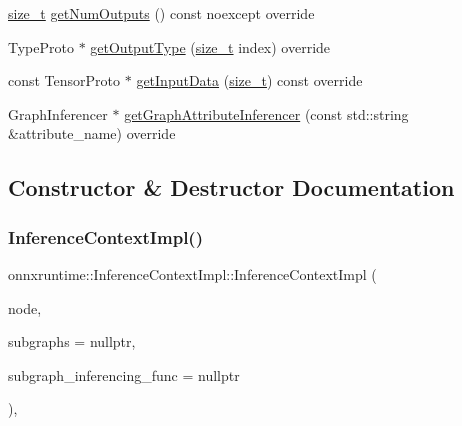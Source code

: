 \begin{DoxyCompactItemize}
\mbox{\hyperlink{mlasi_8h_a503efbc1c6e50825320ad909366b78ab}{size\+\_\+t}} \mbox{\hyperlink{classonnxruntime_1_1InferenceContextImpl_ab596294613aa17dac5621de5662dccb3}{get\+Num\+Outputs}} () const noexcept override
\item 
Type\+Proto $\ast$ \mbox{\hyperlink{classonnxruntime_1_1InferenceContextImpl_aed6ee0c15da7b2a1ceac5e6ee2186905}{get\+Output\+Type}} (\mbox{\hyperlink{mlasi_8h_a503efbc1c6e50825320ad909366b78ab}{size\+\_\+t}} index) override
\item 
const Tensor\+Proto $\ast$ \mbox{\hyperlink{classonnxruntime_1_1InferenceContextImpl_aea78080572e98d85f312099836f15c02}{get\+Input\+Data}} (\mbox{\hyperlink{mlasi_8h_a503efbc1c6e50825320ad909366b78ab}{size\+\_\+t}}) const override
\item 
Graph\+Inferencer $\ast$ \mbox{\hyperlink{classonnxruntime_1_1InferenceContextImpl_ad3a8cd7b05d6d7ea7ccf957aafcebb50}{get\+Graph\+Attribute\+Inferencer}} (const std\+::string \&attribute\+\_\+name) override
\end{DoxyCompactItemize}


\subsection{Constructor \& Destructor Documentation}
\mbox{\label{classonnxruntime_1_1InferenceContextImpl_ac39d7cacfaebe411651b9cef1d3b16a2}} 
\subsubsection{\texorpdfstring{Inference\+Context\+Impl()}{InferenceContextImpl()}}
{\footnotesize\ttfamily onnxruntime\+::\+Inference\+Context\+Impl\+::\+Inference\+Context\+Impl (\begin{DoxyParamCaption}\item[{\mbox{\hyperlink{classonnxruntime_1_1Node}{Node}} \&}]{node,  }\item[{const Attribute\+Graph\+Map $\ast$}]{subgraphs = {\ttfamily nullptr},  }\item[{\mbox{\hyperlink{namespaceonnxruntime_ae184f68a858158d9595f3fe260b05dfb}{Subgraph\+Inferencing\+Func}} $\ast$}]{subgraph\+\_\+inferencing\+\_\+func = {\ttfamily nullptr} }\end{DoxyParamCaption})\hspace{0.3cm}{\ttfamily [inline]}, {\ttfamily [noexcept]}}



